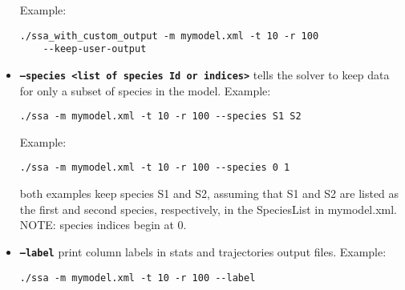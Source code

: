 \documentclass[11pt,letterpaper]{article}
\begin{document}
\begin{itemize}
Example: 
\begin{lstlisting}
./ssa_with_custom_output -m mymodel.xml -t 10 -r 100 
    --keep-user-output
\end{lstlisting}
\item \texttt{\textbf{--species <list of species Id or indices>}} tells the solver to keep data for only a subset of species in the model.
Example: 
\begin{lstlisting}
./ssa -m mymodel.xml -t 10 -r 100 --species S1 S2
\end{lstlisting}
Example: 
\begin{lstlisting}
./ssa -m mymodel.xml -t 10 -r 100 --species 0 1
\end{lstlisting}
both examples keep species S1 and S2, assuming that S1 and S2 are listed as the first and second species, respectively, in the SpeciesList in mymodel.xml.  NOTE: species indices begin at 0.
\item \texttt{\textbf{--label}} print column labels in stats and trajectories output files.
Example:
\begin{lstlisting}
./ssa -m mymodel.xml -t 10 -r 100 --label
\end{lstlisting}
\end{itemize}
\end{document}
